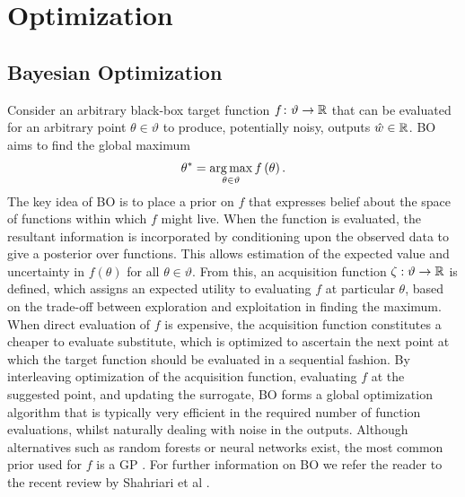 
\chapter{Optimization}
\label{chp:opt}

\section{Bayesian Optimization}
\label{sec:opt:BO}
Consider an arbitrary black-box target function $f \colon \vartheta \rightarrow \mathbb{R}$ that can be evaluated for an arbitrary point $\theta \in \vartheta$ to produce, potentially noisy, outputs $\hat{w} \in \mathbb{R}$.  BO \citep{jones1998efficient,osborne2009gaussian} aims to find the global maximum
\begin{align}
\label{eq:funcMax}
\theta^* = \operatorname*{arg\,max}_{\theta \in \vartheta} f\left(\theta\right).
\end{align}
The key idea of BO is to place a prior on $f$ that expresses belief about the space of functions within which $f$ might live.  When the function is evaluated, the resultant information is incorporated by conditioning upon the observed data to give a posterior over functions.  
This allows estimation of the expected value and uncertainty in $f\left(\theta\right)$ for all $\theta \in \vartheta$.  
From this, an acquisition function $\zeta : \vartheta \rightarrow \mathbb{R}$ is defined, which assigns an expected utility to evaluating $f$ at particular $\theta$, based on the trade-off between exploration and exploitation in finding the maximum.  When direct evaluation of $f$ is expensive, the acquisition function constitutes a cheaper to evaluate substitute, which is optimized to ascertain the next point at which the target function should be evaluated in a sequential fashion.  By interleaving optimization of the acquisition function, evaluating $f$ at the suggested point, and updating the surrogate, BO forms a global optimization algorithm that is typically very efficient in the required number of function evaluations, whilst naturally dealing with noise in the outputs.  Although alternatives such as random forests \citep{bergstra2011algorithms,hutter2011sequential} or neural networks \citep{snoek2015scalable} exist, the most common prior used for $f$ is a GP \citep{rasmussen2006gaussian}.  
For further information on BO we refer the reader to the recent review by Shahriari et al \cite{shahriari2016taking}.

